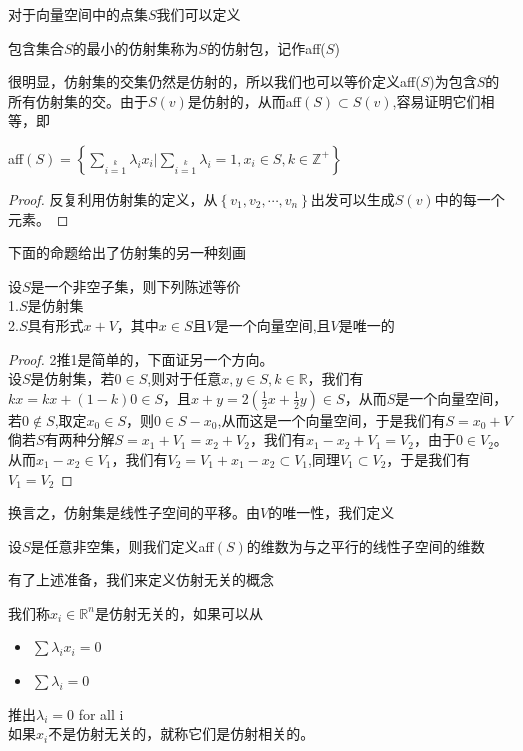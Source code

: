 对于向量空间中的点集$S$我们可以定义
\begin{definition}
包含集合$S$的最小的仿射集称为$S$的仿射包，记作aff($S$)
\end{definition}
很明显，仿射集的交集仍然是仿射的，所以我们也可以等价定义aff($S$)为包含$S$的所有仿射集的交。由于$S(v)$是仿射的，从而aff$(S) \subset S(v)$,容易证明它们相等，即
\begin{proposition}
aff$(S)=\left\{\sum\limits_{i=1}\limits^{k}\lambda_{i}x_{i}|\sum\limits_{i=1}\limits^{k}\lambda_{i}=1,x_{i}\in S,k\in \mathbb{Z}^{+}\right\}$
\end{proposition}
\begin{proof}
反复利用仿射集的定义，从$\left\{v_{1},v_{2},\cdots,v_{n}\right\}$出发可以生成$S(v)$中的每一个元素。
\end{proof}
下面的命题给出了仿射集的另一种刻画
\begin{proposition}
\label{chap1_45}
设$S$是一个非空子集，则下列陈述等价\\
1.$S$是仿射集\\
2.$S$具有形式$x+V$，其中$x\in S$且$V$是一个向量空间,且$V$是唯一的
\end{proposition}
\begin{proof}
2推1是简单的，下面证另一个方向。\\
设$S$是仿射集，若$0\in S$,则对于任意$x,y \in S,k\in\mathbb{R}$，我们有$kx=kx+(1-k)0\in S$，且$x+y=2(\frac{1}{2}x+\frac{1}{2}y)\in S$，从而$S$是一个向量空间，若$0\notin S$,取定$x_{0}\in S$，则$0\in S-x_{0}$,从而这是一个向量空间，于是我们有$S=x_{0}+V$\\
倘若$S$有两种分解$S=x_{1}+V_{1}=x_{2}+V_{2}$，我们有$x_{1}-x_{2}+V_{1}=V_{2}$，由于$0\in V_{2}$。从而$x_{1}-x_{2}\in V_{1}$，我们有$V_{2}=V_{1}+x_{1}-x_{2}\subset V_{1}$,同理$V_{1}\subset V_{2}$，于是我们有$V_{1}=V_{2}$
\end{proof}
换言之，仿射集是线性子空间的平移。由$V$的唯一性，我们定义
\begin{definition}
设$S$是任意非空集，则我们定义aff$(S)$的维数为与之平行的线性子空间的维数
\end{definition}
有了上述准备，我们来定义仿射无关的概念
\begin{definition}[仿射无关]
我们称$x_{i}\in \mathbb{R}^{n}$是仿射无关的，如果可以从
\begin{itemize}
    \item $\sum \lambda_{i}x_{i}=0$
    \item  $\sum \lambda_{i}=0$
\end{itemize}
推出$\lambda_{i}=0$ for all i\\
如果$x_{i}$不是仿射无关的，就称它们是仿射相关的。
\end{definition}
